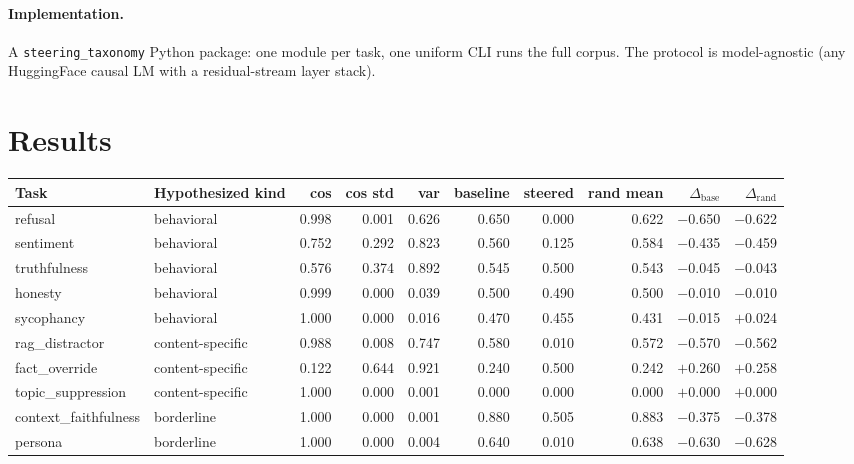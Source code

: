 \documentclass{article}
\begin{document}
\paragraph{Implementation.}
A \texttt{steering\_taxonomy} Python package: one module per task,
one uniform CLI runs the full corpus. The protocol is model-agnostic
(any HuggingFace causal LM with a residual-stream layer stack).

\section{Results}

\begin{table}[t]
\centering\footnotesize
\setlength{\tabcolsep}{4pt}
\begin{tabular}{l l r r r r r r r r}
\toprule
Task & Hypothesized kind & cos & cos std & var & baseline & steered & rand mean & $\Delta_{\text{base}}$ & $\Delta_{\text{rand}}$ \\
\midrule
refusal              & behavioral       & 0.998 & 0.001 & 0.626 & 0.650 & 0.000 & 0.622 & $-$0.650 & $-$0.622 \\
sentiment            & behavioral       & 0.752 & 0.292 & 0.823 & 0.560 & 0.125 & 0.584 & $-$0.435 & $-$0.459 \\
truthfulness         & behavioral       & 0.576 & 0.374 & 0.892 & 0.545 & 0.500 & 0.543 & $-$0.045 & $-$0.043 \\
honesty              & behavioral       & 0.999 & 0.000 & 0.039 & 0.500 & 0.490 & 0.500 & $-$0.010 & $-$0.010 \\
sycophancy           & behavioral       & 1.000 & 0.000 & 0.016 & 0.470 & 0.455 & 0.431 & $-$0.015 & $+$0.024 \\
\midrule
rag\_distractor      & content-specific & 0.988 & 0.008 & 0.747 & 0.580 & 0.010 & 0.572 & $-$0.570 & $-$0.562 \\
fact\_override       & content-specific & 0.122 & 0.644 & 0.921 & 0.240 & 0.500 & 0.242 & $+$0.260 & $+$0.258 \\
topic\_suppression   & content-specific & 1.000 & 0.000 & 0.001 & 0.000 & 0.000 & 0.000 & $+$0.000 & $+$0.000 \\
\midrule
context\_faithfulness & borderline      & 1.000 & 0.000 & 0.001 & 0.880 & 0.505 & 0.883 & $-$0.375 & $-$0.378 \\
persona              & borderline       & 1.000 & 0.000 & 0.004 & 0.640 & 0.010 & 0.638 & $-$0.630 & $-$0.628 \\

\end{tabular}
\end{table}
\end{document}

